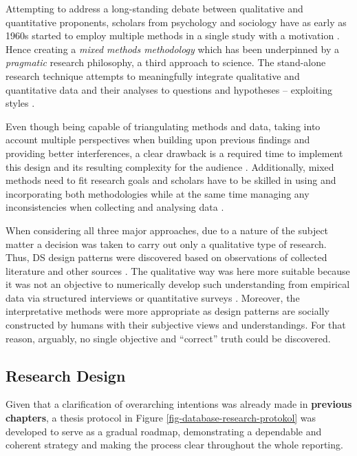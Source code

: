 Attempting to address a long-standing debate between qualitative and quantitative proponents, scholars from psychology and sociology have as early as 1960s started to employ multiple methods in a single study with a motivation  \parencites[61]{SmallMario20111}{Saunders2015}.
Hence creating a \emph{mixed methods methodology} which has been underpinned by a \emph{pragmatic} research philosophy, a third approach to science.
The stand-alone research technique attempts to meaningfully integrate qualitative and quantitative data and their analyses to  questions and hypotheses -- exploiting  styles \parencites[554]{Guetterman2015}{SmallMario20111}{Cameron2009}.

Even though being capable of triangulating methods and data, taking into account multiple perspectives when building upon previous findings and providing better interferences, a clear drawback is a required time to implement this design and its resulting complexity for the audience \parencites{FoodRes2017}{Creswell2003}.
Additionally, mixed methods need to fit research goals and scholars have to be skilled in using and incorporating both methodologies while at the same time managing any inconsistencies when collecting and analysing data \parencite{MalinaMary2011}.

When considering all three major approaches, due to a nature of the subject matter a decision was taken to carry out only a qualitative type of research. 
Thus, \ac{DS} design patterns were discovered based on observations of collected literature and other sources \parencite{Stefan2017}.
The qualitative way was here more suitable because it was not an objective to numerically develop such understanding from empirical data via structured interviews or quantitative surveys \parencite{Schmidt:1996:SP:236156.236164}.
Moreover, the interpretative methods were more appropriate as design patterns are socially constructed by humans with their subjective views and understandings. 
For that reason, arguably, no single objective and \enquote{correct} truth could be discovered. 

\subsection{Research Design}
\label{MyApproachSection}
Given that a clarification of overarching intentions was already made in \textbf{previous chapters}, a thesis protocol in Figure \ref{fig-database-research-protokol} was developed to serve as a gradual roadmap, demonstrating a dependable and coherent strategy and making the process clear throughout the whole reporting. 


